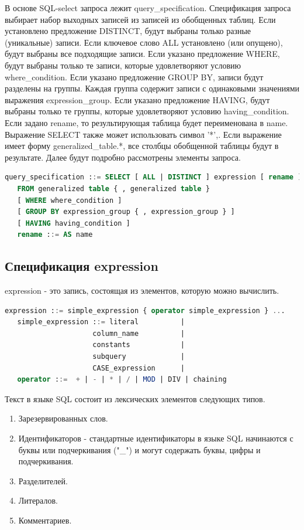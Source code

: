 В основе SQL-select запроса лежит query\_specification.
Спецификация запроса выбирает набор выходных записей из записей из обобщенных таблиц. %
Если установлено предложение DISTINCT, будут выбраны только разные (уникальные) записи. %
Если ключевое слово ALL установлено (или опущено), будут выбраны все подходящие записи.
Если указано предложение WHERE, будут выбраны только те записи, которые удовлетворяют условию where\_condition.
Если указано предложение GROUP BY, записи будут разделены на группы. 
Каждая группа содержит записи с одинаковыми значениями выражения expression\_group.
Если указано предложение HAVING, будут выбраны только те группы, которые удовлетворяют условию having\_condition.
Если задано rename, то результирующая таблица будет переименована в name.
Выражение SELECT также может использовать символ '*',.
Если выражение имеет форму generalized\_table.*, все столбцы обобщенной таблицы будут в результате. 
Далее будут подробно рассмотрены элементы запроса.

\begin{lstlisting}[language=sql, label=some-code, caption=Спецификация SQL запроса]
   query_specification ::= SELECT [ ALL | DISTINCT ] expression [ rename ] { , expression [ rename ] } 
   FROM generalized table { , generalized table } 
   [ WHERE where_condition ] 
   [ GROUP BY expression_group { , expression_group } ]
   [ HAVING having_condition ]
   rename ::= AS name
\end{lstlisting}

\subsection{Спецификация expression}

expression - это запись, состоящая из элементов, которую можно вычислить. 

\begin{lstlisting}[language=sql, label=some-code, caption=Спецификация SQL запроса]
   expression ::= simple_expression { operator simple_expression } ...
   simple_expression ::= literal          |
                     column_name          |
                     constants            |
                     subquery             |
                     CASE_expression      |
   operator ::=  + | - | * | / | MOD | DIV | chaining
\end{lstlisting}

Текст в языке SQL состоит из лексических элементов следующих типов.
\begin{enumerate}
   \item Зарезервированных слов.
   \item Идентификаторов - стандартные идентификаторы в языке SQL начинаются с буквы или подчеркивания ("\_") и могут содержать буквы, цифры и подчеркивания.
   \item Разделителей.
   \item Литералов.
   \item Комментариев.
\end{enumerate}


